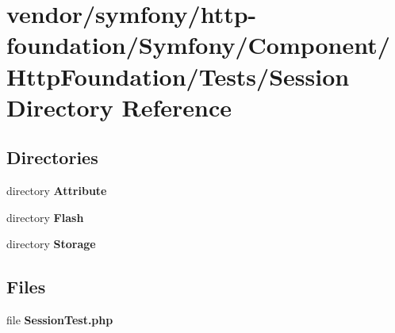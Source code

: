 \section{vendor/symfony/http-\/foundation/\+Symfony/\+Component/\+Http\+Foundation/\+Tests/\+Session Directory Reference}
\label{dir_845a30a7cd3873349f810966264fbf59}
\subsection*{Directories}
\begin{DoxyCompactItemize}
\item 
directory {\bf Attribute}
\item 
directory {\bf Flash}
\item 
directory {\bf Storage}
\end{DoxyCompactItemize}
\subsection*{Files}
\begin{DoxyCompactItemize}
\item 
file {\bf Session\+Test.\+php}
\end{DoxyCompactItemize}
